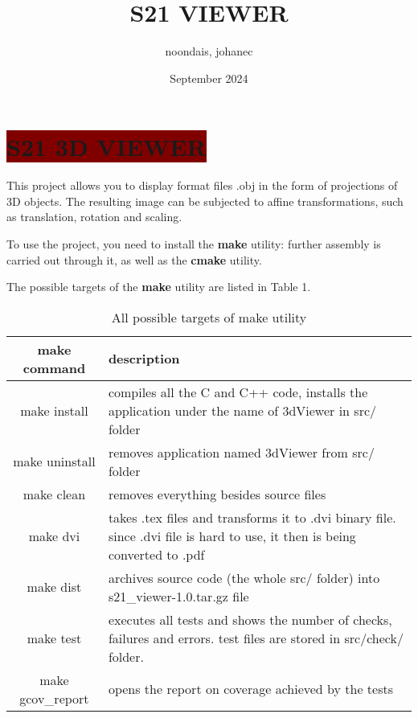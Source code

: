\documentclass{article}
\title{S21 VIEWER}
\author{noondais, johanec}
\date{September 2024}
\begin{document}
\color{white}
\section*{\Huge\colorbox{Maroon}{ S21 3D VIEWER}}
This project allows you to display format files .obj in the form of projections of 3D objects. The resulting image can be subjected to affine transformations, such as translation, rotation and scaling.

To use the project, you need to install the {\color{CadetBlue}\textbf{make}} utility: further assembly is carried out through it, as well as the {\color{CadetBlue}\textbf{cmake}} utility.

The possible targets of the {\color{CadetBlue}\textbf{make}} utility are listed in Table 1.

\begin{table}[h!]
    \color{white}
    \centering
    \begin{tabular}{| c | p{10cm} |}
    \hline
    
     make command &  description  \\
    \hline
    \hline
    make install &  compiles all the C and C++ code, installs the application under the name of 3dViewer  in {\color{Maroon}src/} folder \\
   
     make uninstall & removes application named 3dViewer from {\color{Maroon}src/} folder \\
    
     make clean &  removes everything besides source files \\
    
   make dvi &  takes .tex files and transforms it to .dvi binary file. since .dvi file is hard to use, it then is being converted to .pdf \\
   
    make dist &  archives source code (the whole {\color{Maroon}src/} folder) into {\color{Maroon}s21\_viewer-1.0.tar.gz} file \\
    
     make test &  executes all tests and shows the number of checks, failures and errors. test files are stored in {\color{Maroon}src/check/} folder. \\
     make gcov\_report &  opens the report on coverage achieved by the tests \\

    
    \hline
    \end{tabular}

    \caption{All possible targets of make utility}
    \label{tab1}
\end{table}
\end{document}
